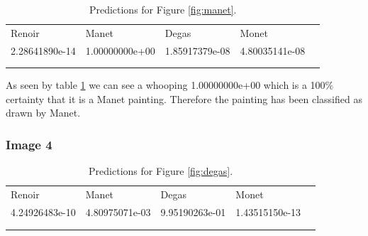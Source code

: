 \begin{table}[H]
    \centering
    \caption{Predictions for Figure \ref{fig:manet}.}
    \label{tbl:manet_predictions}
    \begin{tabular}{lllll}
    \cline{1-4}
    \multicolumn{1}{|l|}{Renoir}         & \multicolumn{1}{l|}{Manet}          & \multicolumn{1}{l|}{Degas}          & \multicolumn{1}{l|}{Monet}          &  \\ \cline{1-4}
    \multicolumn{1}{|l|}{2.28641890e-14} & \multicolumn{1}{l|}{1.00000000e+00} & \multicolumn{1}{l|}{1.85917379e-08} & \multicolumn{1}{l|}{4.80035141e-08} &  \\ \cline{1-4}
                                         &                                     &                                     &                                     &  \\
                                         &                                     &                                     &                                     & 
    \end{tabular}
\end{table}

As seen by table \ref{tbl:manet_predictions} we can see a whooping 1.00000000e+00 which is a 100\% certainty that it is a Manet painting. Therefore the painting has been classified as drawn by Manet.



\subsubsection*{Image 4}

\begin{table}[H]
    \centering
    \caption{Predictions for Figure \ref{fig:degas}.}
    \label{tbl:degas_predictions}
    \begin{tabular}{lllll}
    \cline{1-4}
    \multicolumn{1}{|l|}{Renoir}         & \multicolumn{1}{l|}{Manet}          & \multicolumn{1}{l|}{Degas}          & \multicolumn{1}{l|}{Monet}          &  \\ \cline{1-4}
    \multicolumn{1}{|l|}{4.24926483e-10} & \multicolumn{1}{l|}{4.80975071e-03} & \multicolumn{1}{l|}{9.95190263e-01} & \multicolumn{1}{l|}{1.43515150e-13} &  \\ \cline{1-4}
                                         &                                     &                                     &                                     &  \\
                                         &                                     &                                     &                                     & 
    \end{tabular}
\end{table}


